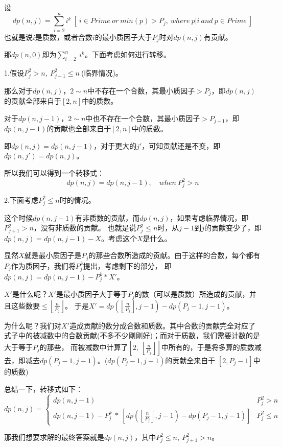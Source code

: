 设
$$
dp(n,j)=\sum_{i=2}^ni^k\ [\ i\in Prime\ or \ min(p)>P_j,\ where\ p|i\ and\ p\in Prime\ ]
$$
也就是说$i$是质数，或者合数$i$的最小质因子大于$P_j$时对$dp(n,j)$有贡献。

那$dp(n,0)$即为$\sum_{i=2}^n\ i^k$。下面考虑如何进行转移。

{\heiti 1.假设$P_j^2>n,\ P_{j-1}^2\le n\ $(临界情况)。}

那么对于$dp(n,j)$，$2\sim n$中不存在一个合数，其最小质因子$>P_j$，即$dp(n,j)$的贡献全部来自于$[2,n]$中的质数。

对于$dp(n,j-1)$，$2\sim n$中也不存在一个合数，其最小质因子$>P_{j-1}$，即$dp(n,j-1)$的贡献也全部来自于$[2,n]$中的质数。

即$dp(n,j) = dp(n,j-1)$，对于更大的$j'$，可知贡献还是不变，即$dp(n,j') = dp(n,j)$。

所以我们可以得到一个转移式：
$$
dp(n,j) = dp(n,j-1),\quad when\ P_j^2>n
$$

{\heiti 2.下面考虑$P_j^2\le n$时的情况。}

这个时候$dp(n,j-1)$有非质数的贡献，而$dp(n,j)$，如果考虑临界情况，即$P_{j+1}^2>n$，没有非质数的贡献。
也就是说$P_j^2\le n$时，从$j-1$到$j$的贡献变少了，即$dp(n,j) = dp(n,j-1) - X$。考虑这个$X$是什么。

显然$X$就是最小质因子是$P_j$的那些合数所造成的贡献。由于这样的合数，每个都有$P_j$作为质因子，我们将$P_j^k$提出，考虑剩下的部分，
即$dp(n,j) = dp(n,j-1) - P_j^k*X'$。

$X'$是什么呢？$X'$是最小质因子大于等于$P_j$的数（可以是质数）所造成的贡献，并且这些数要$\le \left\lfloor \frac{n}{P_j} \right\rfloor$。 
于是$X' = dp(\left\lfloor \frac{n}{P_j} \right\rfloor,j-1)-dp(P_j-1,j-1)$。

为什么呢？我们对$X'$造成贡献的数分成合数和质数。其中合数的贡献完全对应了式子中的被减数中的合数贡献(不多不少刚刚好)；而对于质数，我们需要计数的是大于等于$P_j$的那些，
而被减数中计算了$[2,\ \left\lfloor \frac{n}{P_j} \right\rfloor]$中所有的，于是将多算的质数减去，即减去$dp(P_j-1,j-1)$。(\quad $dp(P_j-1,j-1)$的贡献全来自于
$[2,P_j-1]$中的质数\quad )

总结一下，转移式如下：
$$
dp(n,j)=
\begin{cases}
dp(n,j-1)&P_j^2 > n\\
dp(n,j-1)-P_{j}^k\ *\ [dp(\left\lfloor \frac{n}{P_j} \right\rfloor,j-1)-dp(P_j-1,j-1)]&P_j^2\le n
\end{cases}
$$

{\heiti 那我们想要求解的最终答案就是$dp(n,j)$，其中$P_j^2\le n,\ P_{j+1}^2> n$。}

